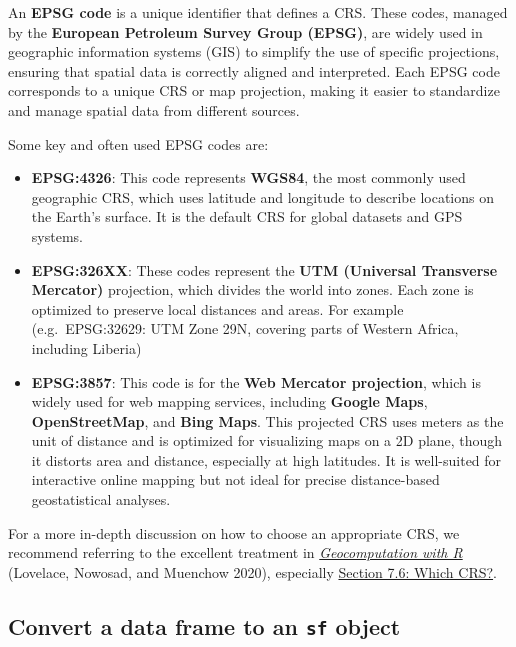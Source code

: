 \documentclass[
  letterpaper,
]{krantz}
\begin{document}
An \textbf{EPSG code} is a unique identifier that defines a CRS. These
codes, managed by the \textbf{European Petroleum Survey Group (EPSG)},
are widely used in geographic information systems (GIS) to simplify the
use of specific projections, ensuring that spatial data is correctly
aligned and interpreted. Each EPSG code corresponds to a unique CRS or
map projection, making it easier to standardize and manage spatial data
from different sources.

Some key and often used EPSG codes are:

\begin{itemize}
\item
  \textbf{EPSG:4326}: This code represents \textbf{WGS84}, the most
  commonly used geographic CRS, which uses latitude and longitude to
  describe locations on the Earth's surface. It is the default CRS for
  global datasets and GPS systems.
\item
  \textbf{EPSG:326XX}: These codes represent the \textbf{UTM (Universal
  Transverse Mercator)} projection, which divides the world into zones.
  Each zone is optimized to preserve local distances and areas. For
  example (e.g.~EPSG:32629: UTM Zone 29N, covering parts of Western
  Africa, including Liberia)
\item
  \textbf{EPSG:3857}: This code is for the \textbf{Web Mercator
  projection}, which is widely used for web mapping services, including
  \textbf{Google Maps}, \textbf{OpenStreetMap}, and \textbf{Bing Maps}.
  This projected CRS uses meters as the unit of distance and is
  optimized for visualizing maps on a 2D plane, though it distorts area
  and distance, especially at high latitudes. It is well-suited for
  interactive online mapping but not ideal for precise distance-based
  geostatistical analyses.
\end{itemize}

For a more in-depth discussion on how to choose an appropriate CRS, we
recommend referring to the excellent treatment in
\href{https://r.geocompx.org}{\emph{Geocomputation with R}} (Lovelace,
Nowosad, and Muenchow 2020), especially
\href{https://r.geocompx.org/reproj-geo-data\#which-crs}{Section 7.6:
Which CRS?}.

\subsection{\texorpdfstring{Convert a data frame to an \texttt{sf}
object}{Convert a data frame to an sf object}}\label{convert-a-data-frame-to-an-sf-object}
\end{document}
